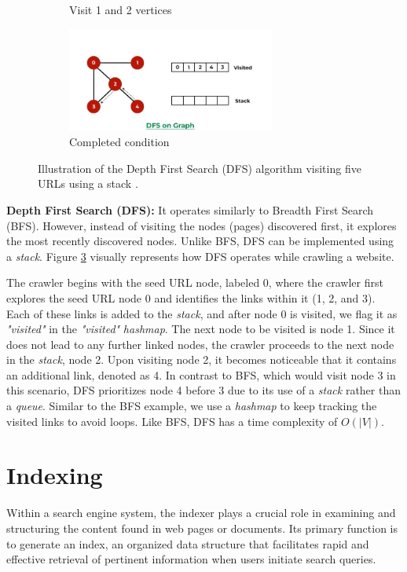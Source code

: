 \begin{figure}[ht]
\begin{subfigure}[b]{0.5\textwidth}
    \caption{Visit 1 and 2 vertices} 
    \label{fig7:c} 
  \end{subfigure}%
  \begin{subfigure}[b]{0.5\textwidth}
    \centering
    \includegraphics[width=0.75\textwidth]{figures/dfs-4.png} 
    \caption{Completed condition} 
    \label{fig7:d} 
  \end{subfigure} 
  \caption{Illustration of the Depth First Search (DFS) algorithm visiting five URLs using a stack
 \cite{dfs}.}
  \label{fig:dfs} 
\end{figure}

\textbf{Depth First Search (DFS):} It operates similarly to Breadth First Search (BFS). However, instead of visiting the nodes (pages) discovered first, it explores the most recently discovered nodes. Unlike BFS, DFS can be implemented using a \textit{stack}. Figure \ref{fig:dfs} visually represents how DFS operates while crawling a website.

The crawler begins with the seed URL node, labeled 0, where the crawler first explores the seed URL node 0 and identifies the links within it (1, 2, and 3). Each of these links is added to the \textit{stack}, and after node 0 is visited, we flag it as \textit{"visited"} in the \textit{"visited"} \textit{hashmap}. The next node to be visited is node 1. Since it does not lead to any further linked nodes, the crawler proceeds to the next node in the \textit{stack}, node 2. Upon visiting node 2, it becomes noticeable that it contains an additional link, denoted as 4. In contrast to BFS, which would visit node 3 in this scenario, DFS prioritizes node 4 before 3 due to its use of a \textit{stack} rather than a \textit{queue}. Similar to the BFS example, we use a \textit{hashmap} to keep tracking the visited links to avoid loops. Like BFS, DFS has a time complexity of $O(|V|)$.

\section{Indexing}
\label{sec:indexing}
Within a search engine system, the indexer plays a crucial role in examining and structuring the content found in web pages or documents. Its primary function is to generate an index, an organized data structure that facilitates rapid and effective retrieval of pertinent information when users initiate search queries.

